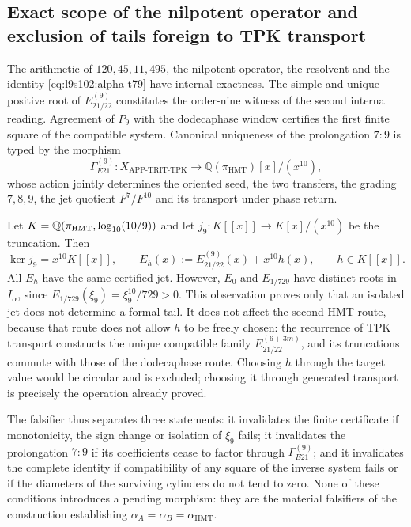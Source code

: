 \subsection{Exact scope of the nilpotent operator and exclusion of tails foreign to TPK transport}
\label{sec:l9s102:alpha-alcance}

The arithmetic of \(120,45,11,495\), the nilpotent operator, the resolvent and
the identity \cref{eq:l9s102:alpha-t79} have internal exactness. The simple and unique positive
root of \(E_{21/22}^{(9)}\) constitutes the order-nine
witness of the second internal reading. Agreement of \(P_9\) with the
dodecaphase window certifies the first finite square of the compatible
system. Canonical uniqueness of the prolongation \(7{:}9\) is typed
by the morphism
\begin{equation}
 \Gamma_{E21}^{(9)}:
 X_{\mathrm{APP\text{-}TRIT\text{-}TPK}}
 \longrightarrow \mathbb Q(\pi_{\mathrm{HMT}})[x]/(x^{10}),
 \label{eq:l9s102:alpha-gamma-e21}
\end{equation}
whose action jointly determines the oriented seed, the two
transfers, the grading \(7,8,9\), the jet quotient
\(F^7/F^{10}\) and its transport under phase return.

Let \(K=\mathbb Q(\pi_{\rm HMT},\log_{10}(10/9))\) and let
\(j_9:K[[x]]\to K[x]/(x^{10})\) be the truncation. Then
\begin{equation}
 \ker j_9=x^{10}K[[x]],
 \qquad
 E_h(x):=E_{21/22}^{(9)}(x)+x^{10}h(x),
 \qquad h\in K[[x]].
\label{eq:l9s102:alpha-limite-jets-e21}
\end{equation}
All \(E_h\) have the same certified jet. However,
\(E_0\) and \(E_{1/729}\) have distinct roots in \(I_\alpha\), since
\(E_{1/729}(\xi_9)=\xi_9^{10}/729>0\). This observation proves only
that an isolated jet does not determine a formal tail. It does not affect the second HMT
route, because that route does not allow \(h\) to be freely chosen: the recurrence of
TPK transport constructs the unique compatible family
\(E_{21/22}^{(6+3m)}\), and its truncations commute with those of the
dodecaphase route. Choosing \(h\) through the target value would be circular and is
excluded; choosing it through generated transport is precisely the
operation already proved.

The falsifier thus separates three statements: it invalidates the finite certificate if
monotonicity, the sign change or isolation of \(\xi_9\) fails;
it invalidates the prolongation \(7{:}9\) if its coefficients cease to factor through
\(\Gamma_{E21}^{(9)}\); and it invalidates the complete identity if compatibility
of any square of the inverse system fails or if the diameters of
the surviving cylinders do not tend to zero. None of these conditions
introduces a pending morphism: they are the material falsifiers of the
construction establishing
\(\alpha_A=\alpha_B=\alpha_{\mathrm{HMT}}\).
